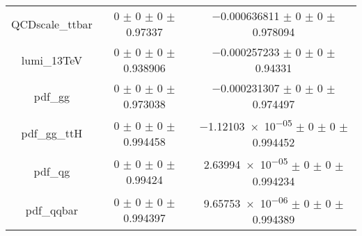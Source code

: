 \begin{table}
\begin{tabular}{ccc}
QCDscale\_ttbar & \num{0} $\pm$ \num{0} $\pm$ \num{0} $\pm$ \num{0.97337} & \num{-0.000636811} $\pm$ \num{0} $\pm$ \num{0} $\pm$ \num{0.978094}\\
lumi\_13TeV & \num{0} $\pm$ \num{0} $\pm$ \num{0} $\pm$ \num{0.938906} & \num{-0.000257233} $\pm$ \num{0} $\pm$ \num{0} $\pm$ \num{0.94331}\\
pdf\_gg & \num{0} $\pm$ \num{0} $\pm$ \num{0} $\pm$ \num{0.973038} & \num{-0.000231307} $\pm$ \num{0} $\pm$ \num{0} $\pm$ \num{0.974497}\\
pdf\_gg\_ttH & \num{0} $\pm$ \num{0} $\pm$ \num{0} $\pm$ \num{0.994458} & \num{-1.12103e-05} $\pm$ \num{0} $\pm$ \num{0} $\pm$ \num{0.994452}\\
pdf\_qg & \num{0} $\pm$ \num{0} $\pm$ \num{0} $\pm$ \num{0.99424} & \num{2.63994e-05} $\pm$ \num{0} $\pm$ \num{0} $\pm$ \num{0.994234}\\
pdf\_qqbar & \num{0} $\pm$ \num{0} $\pm$ \num{0} $\pm$ \num{0.994397} & \num{9.65753e-06} $\pm$ \num{0} $\pm$ \num{0} $\pm$ \num{0.994389}\\
\bottomrule
\end{tabular}
\end{table}